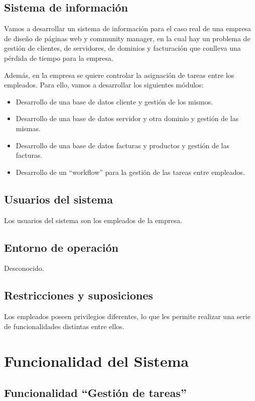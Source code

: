 \documentclass[paper=a4, fontsize=11pt, spanish]{scrartcl}
\begin{document}
\subsection{Sistema de información}
\setlength{\parindent}{3em} Vamos a desarrollar un sistema de información para el caso real de una empresa de diseño de páginas web y community manager, en la cual hay un problema de gestión de clientes, de servidores, de dominios y facturación que conlleva una pérdida de tiempo para la empresa.

Además, en la empresa se quiere controlar la asignación de tareas entre los empleados.
Para ello, vamos a desarrollar los siguientes módulos:
\begin{itemize}
\item Desarrollo de una base de datos cliente y gestión de los mismos.
\item Desarrollo de una base de datos servidor y otra dominio y gestión de las mismas.
\item Desarrollo de una base de datos facturas y productos y gestión de las facturas.
\item Desarrollo de un “workflow” para la gestión de las tareas entre empleados.
\end{itemize}

\subsection{Usuarios del sistema}
\setlength{\parindent}{0em}Los usuarios del sistema son los empleados de la empresa.

\subsection{Entorno de operación}
\setlength{\parindent}{3em} Desconocido.

\subsection{Restricciones y suposiciones}
\setlength{\parindent}{3em} Los empleados poseen privilegios diferentes, lo que les permite realizar una serie de funcionalidades distintas entre ellos.

\section{Funcionalidad del Sistema}

\subsection{Funcionalidad “Gestión de tareas”}
\end{document}
